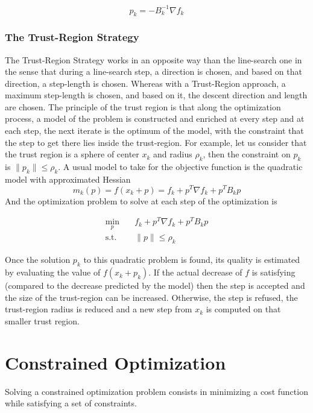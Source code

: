 \begin{equation}
  p_k = -B_k^{-1}\nabla f_k
\end{equation}

\subsubsection{The Trust-Region Strategy}
The Trust-Region Strategy works in an opposite way than the line-search one in
the sense that during a line-search step, a direction is chosen, and based on
that direction, a step-length is chosen. Whereas with a Trust-Region approach, a
maximum step-length is chosen, and based on it, the descent direction and length
are chosen.
The principle of the trust region is that along the optimization process, a
model of the problem is constructed and enriched at every step and at each step,
the next iterate is the optimum of the model, with the constraint that the step
to get there lies inside the trust-region. For example, let us consider that
the trust region is a sphere of center $x_k$ and radius $\rho_k$, then the
constraint on $p_k$ is $\|p_k\| \leq \rho_k$. A usual model to take for the
objective function is the quadratic model with approximated Hessian
\begin{equation}
  m_k(p) = f(x_k+p) = f_k + p^T\nabla f_k + p^TB_k p
\end{equation}
And the optimization problem to solve at each step of the optimization is

\begin{align}
  \min_{p} & \quad f_k + p^T\nabla f_k + p^TB_k p \nonumber\\
\text{s.t.}&
\quad \|p\| \leq \rho_k
\label{eq:trustRegionNLP}
\end{align}

Once the solution $p_k$ to this quadratic problem is found, its quality is
estimated by evaluating the value of $f(x_k+p_k)$. If the actual decrease of $f$
is satisfying (compared to the decrease predicted by the model) then the step is
accepted and the size of the trust-region can be increased. Otherwise, the step
is refused, the trust-region radius is reduced and a new step from $x_k$ is
computed on that smaller trust region.

\section{Constrained Optimization}

Solving a constrained optimization problem consists in minimizing a cost function while satisfying a set of constraints.

